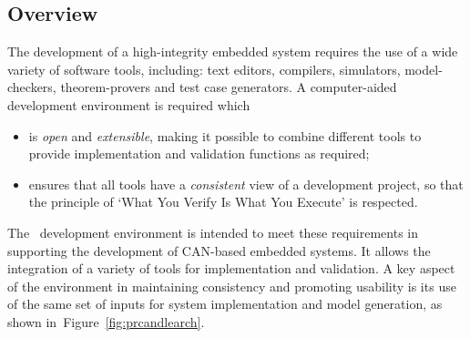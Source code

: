 \subsection{Overview}
The development of a high-integrity  embedded system requires the use of a 
wide variety of software tools, including: text editors, compilers, 
simulators, model-checkers, theorem-provers and test case generators. 
A computer-aided development environment is required which  
\begin{itemize}
\item is \emph{open} and \emph{extensible}, making it possible to combine 
different tools to provide implementation and validation functions as 
required;  
\item ensures that all tools have a \emph{consistent} view of a development 
  project, so that the principle of `What You Verify Is What You Execute' 
  is respected.
\end{itemize}  
The \candle\ development environment is intended to meet these
requirements in supporting the development of CAN-based embedded
systems. It allows the integration of a variety of tools for
implementation and validation.  A key aspect of the environment in
maintaining consistency and promoting usability is its use of the same
set of inputs for system implementation and model generation, as shown
in~Figure~\ref{fig:prcandlearch}.
